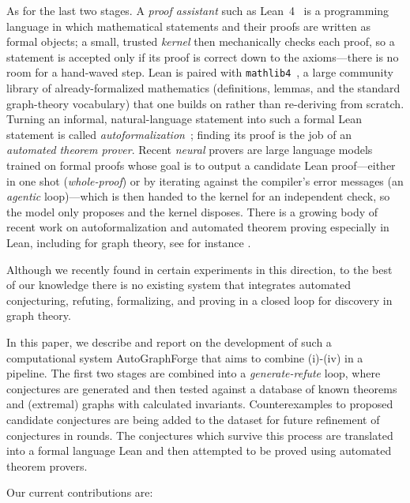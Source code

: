 \documentclass[]{ceurart}
\begin{document}
As for the last two stages. A \emph{proof assistant}
such as Lean~4~\cite{moura2015lean} is a programming language in which mathematical statements and
their proofs are written as formal objects; a small, trusted \emph{kernel} then mechanically checks
each proof, so a statement is accepted only if its proof is correct down to the axioms---there is no
room for a hand-waved step. Lean is paired with \texttt{mathlib4}~\cite{vandoorn2020maintaining}, a
large community library of already-formalized mathematics (definitions, lemmas, and the standard
graph-theory vocabulary) that one builds on rather than re-deriving from scratch. Turning an informal,
natural-language statement into such a formal Lean statement is called
\emph{autoformalization}~\cite{wu2022autoformalization}; finding its proof is the job of an
\emph{automated theorem prover}. Recent \emph{neural} provers are large language models trained on
formal proofs whose goal is to output a candidate Lean proof---either in one shot (\emph{whole-proof}) or by
iterating against the compiler's error messages (an \emph{agentic} loop)---which is then handed to the
kernel for an independent check, so the model only proposes and the kernel disposes. There is a growing body of recent work on autoformalization and automated theorem proving especially in Lean, including for graph theory, see for instance \cite{wu2022autoformalization,mavani2026chipfiring,nader2026gtbench,kalfus2026ramsey,zhang2026leanmarathon,deepseek2025prover}. 

Although we recently found in \cite{davila2026graffiti3} certain experiments in this direction, to the best of our knowledge there is no existing system that integrates automated conjecturing, refuting, formalizing, and proving in a closed loop for discovery in graph theory.

In this paper, we describe and report on the development of such a computational system \textsf{AutoGraphForge} that aims to combine (i)-(iv) in a pipeline. The first two stages are combined into a \emph{generate-refute} loop, where conjectures are generated and then tested against a database of known theorems and (extremal) graphs with calculated invariants. Counterexamples to proposed candidate conjectures are being added to the dataset for future refinement of conjectures in rounds. The conjectures which survive this process are translated into a formal language Lean and then attempted to be proved using automated theorem provers.

Our current contributions are:
\end{document}
